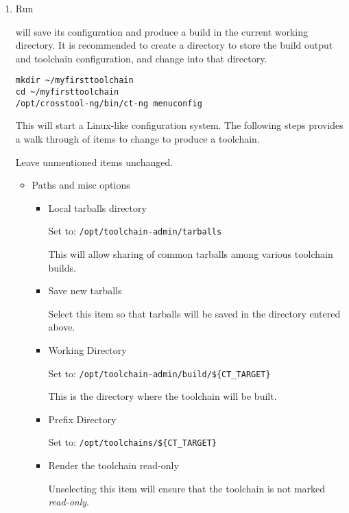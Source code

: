 \begin{enumerate}
\item Run \ctng

    \ctng will save its configuration and produce a build in the
    current working directory.  It is recommended to create a
    directory to store the build output and toolchain configuration,
    and change into that directory.

\begin{verbatim}
mkdir ~/myfirsttoolchain
cd ~/myfirsttoolchain
/opt/crosstool-ng/bin/ct-ng menuconfig
\end{verbatim}

    This will start a Linux-like configuration system.  The following
    steps provides a walk through of items to change to produce a
    toolchain.

    Leave unmentioned items unchanged.

    \begin{itemize}

    \item Paths and misc options

      \begin{itemize}
      \item{Local tarballs directory}

        Set to: \texttt{/opt/toolchain-admin/tarballs}

        This will allow sharing of common tarballs among various
        toolchain builds.

      \item{Save new tarballs}

        Select this item so that tarballs will be saved in the
        directory entered above.

      \item{Working Directory}

        Set to: \texttt{/opt/toolchain-admin/build/\$\{CT\_TARGET\}}

        This is the directory where the toolchain will be built.

      \item{Prefix Directory}

        Set to: \texttt{/opt/toolchains/\$\{CT\_TARGET\}}

      \item{Render the toolchain read-only}

        Unselecting this item will ensure that the toolchain is not
        marked \emph{read-only}.


\end{itemize}
\end{itemize}
\end{enumerate}
